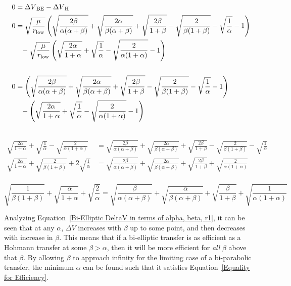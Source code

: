 \documentclass[../basicOrbitalDynamics.tex]{subfiles}
\begin{document}

\begin{align*}
    0 &={\Delta V}_\text{BE}-{\Delta V}_\text{H}\\
    0 &=\sqrt{\frac{\mu}{{r}_\text{low}}}\left(\sqrt{\frac{2\beta}{\alpha(\alpha+\beta)}}+\sqrt{\frac{2\alpha}{\beta(\alpha+\beta)}}+\sqrt{\frac{2\beta}{1+\beta}}-\sqrt{\frac{2}{\beta(1+\beta)}}-\sqrt{\frac{1}{\alpha}}-1\right) \\
      & \phantom{=}-\sqrt{\frac{\mu}{{r}_\text{low}}}\left(\sqrt{\frac{2\alpha}{1+\alpha}}+\sqrt{\frac{1}{\alpha}}-\sqrt{\frac{2}{\alpha(1+\alpha)}}-1\right) \\\\
    0 &=\left(\sqrt{\frac{2\beta}{\alpha(\alpha+\beta)}}+\sqrt{\frac{2\alpha}{\beta(\alpha+\beta)}}+\sqrt{\frac{2\beta}{1+\beta}}-\sqrt{\frac{2}{\beta(1+\beta)}}-\sqrt{\frac{1}{\alpha}}-1\right) \\
      & \phantom{=}-\left(\sqrt{\frac{2\alpha}{1+\alpha}}+\sqrt{\frac{1}{\alpha}}-\sqrt{\frac{2}{\alpha(1+\alpha)}}-1\right) \\\\
\end{align*}
\begin{align*}
    \sqrt{\frac{2\alpha}{1+\alpha}}+\sqrt{\frac{1}{\alpha}}-\sqrt{\frac{2}{\alpha(1+\alpha)}} &=\sqrt{\frac{2\beta}{\alpha(\alpha+\beta)}}+\sqrt{\frac{2\alpha}{\beta(\alpha+\beta)}}+\sqrt{\frac{2\beta}{1+\beta}}-\sqrt{\frac{2}{\beta(1+\beta)}}-\sqrt{\frac{1}{\alpha}} \\
    \sqrt{\frac{2\alpha}{1+\alpha}}+\sqrt{\frac{2}{\beta(1+\beta)}}+2\sqrt{\frac{1}{\alpha}}&=\sqrt{\frac{2\beta}{\alpha(\alpha+\beta)}}+\sqrt{\frac{2\alpha}{\beta(\alpha+\beta)}}+\sqrt{\frac{2\beta}{1+\beta}}+\sqrt{\frac{2}{\alpha(1+\alpha)}} \\
\end{align*}

\begin{equation}\label{Equality for Efficiency}
    \sqrt{\frac{1}{\beta(1+\beta)}}+\sqrt{\frac{\alpha}{1+\alpha}}+\sqrt{\frac{2}{\alpha}}=\sqrt{\frac{\beta}{\alpha(\alpha+\beta)}}+\sqrt{\frac{\alpha}{\beta(\alpha+\beta)}}+\sqrt{\frac{\beta}{1+\beta}}+\sqrt{\frac{1}{\alpha(1+\alpha)}}
\end{equation}

Analyzing Equation~\eqref{Bi-Elliptic DeltaV in terms of alpha, beta, r1}, it can be seen that at any $\alpha$, $\Delta V$ increases with $\beta$ up to some point, and then decreases with increase in $\beta$. This means that if a bi-elliptic transfer is as efficient as a Hohmann transfer at some $\beta>\alpha$, then it will be more efficient for \textit{all} $\beta$ above that $\beta$. By allowing $\beta$ to approach infinity for the limiting case of a bi-parabolic transfer, the minimum $\alpha$ can be found such that it satisfies Equation~\eqref{Equality for Efficiency}.
\end{document}
